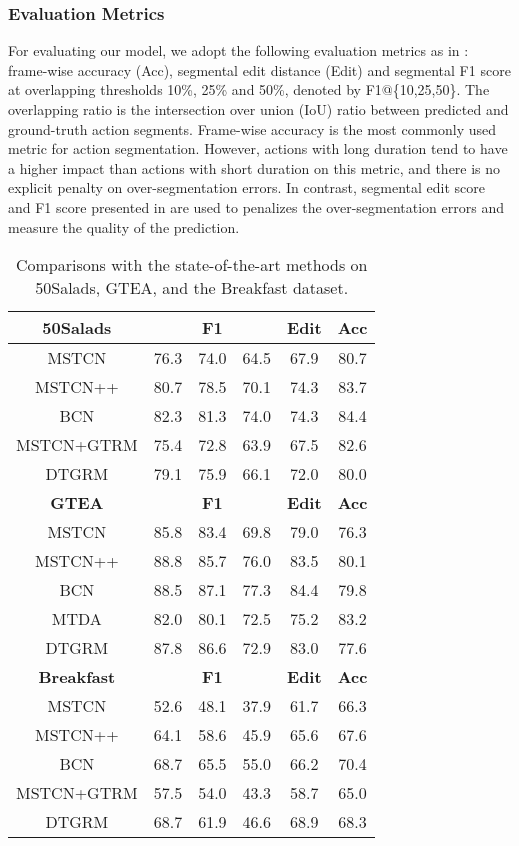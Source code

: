 \documentclass[letterpaper]{article} \usepackage{aaai21}  \usepackage{times}  \usepackage{helvet} \usepackage{courier}  \usepackage[hyphens]{url}  \usepackage{graphicx} \usepackage{mathtools}
\begin{document}
\subsubsection{Evaluation Metrics}
For evaluating our model, we adopt the following evaluation metrics as in \cite{lea2017temporal,farha2019ms,huang2020improving}: frame-wise accuracy (Acc), segmental edit distance (Edit) and segmental F1 score at overlapping thresholds 10\%, 25\% and 50\%, denoted by F1@\{10,25,50\}. The overlapping ratio is the intersection over union (IoU) ratio between predicted and ground-truth action segments. Frame-wise accuracy is the most commonly used metric for action segmentation. However, actions with long duration tend to have a higher impact than actions with short duration on this metric, and there is no explicit penalty on over-segmentation errors. In contrast, segmental edit score and F1 score presented in \cite{lea2017temporal,lea2016segmental} are used to penalizes the over-segmentation errors and measure the quality of the prediction.

\begin{table}[htbp]
	\centering
	\caption{Comparisons with the state-of-the-art methods on 50Salads, GTEA, and the Breakfast dataset.}
	\vspace{-0.2cm}
	\begin{tabular}{cccccc}
		\hline
		\textbf{50Salads} &\multicolumn{3}{c}{\textbf{F1}} &\textbf{Edit} &\textbf{Acc} \\  
		\hline
		MSTCN &76.3 &74.0 &64.5 &67.9 &80.7 \\
		MSTCN++ &80.7 &78.5 &70.1 &74.3 &83.7 \\
		BCN &82.3 &81.3 &74.0 &74.3 &84.4 \\
		MSTCN+GTRM &75.4 &72.8 &63.9 &67.5 &82.6 \\
		\hline
		DTGRM &79.1 &75.9 &66.1 &72.0 &80.0 \\
		\hline
		\hline
		\textbf{GTEA} &\multicolumn{3}{c}{\textbf{F1}} &\textbf{Edit} &\textbf{Acc} \\ 
		\hline
		MSTCN &85.8 &83.4 &69.8 &79.0 &76.3 \\
		MSTCN++ &88.8 &85.7 &76.0 &83.5 &80.1 \\
		BCN &88.5 &87.1 &77.3 &84.4 &79.8 \\
		MTDA &82.0 &80.1 &72.5 &75.2 &83.2 \\
		\hline
		DTGRM &87.8 &86.6 &72.9 &83.0 &77.6\\
		\hline
		\hline
		\textbf{Breakfast} &\multicolumn{3}{c}{\textbf{F1}} &\textbf{Edit} &\textbf{Acc} \\ 
		\hline
		MSTCN &52.6 &48.1 &37.9 &61.7 &66.3 \\
		MSTCN++ &64.1 &58.6 &45.9 &65.6 &67.6 \\
		BCN &68.7 &65.5 &55.0 &66.2 &70.4 \\
		MSTCN+GTRM &57.5 &54.0 &43.3 &58.7 &65.0 \\
		\hline
		DTGRM	&68.7 &61.9 &46.6 &68.9 &68.3\\
		\hline
	\end{tabular}\label{Table-compare-sota}
\end{table}
\end{document}
